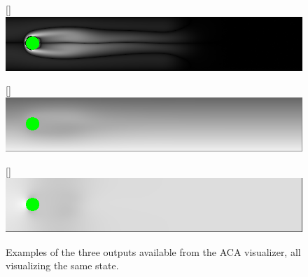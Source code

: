 \begin{figure}[ht]
    \centering
    [\linewidth]{\includegraphics[width=\linewidth,natwidth=660,natheight=120]{Ch20Research/figures/output_zeta.png}
    }
    
    [\linewidth]{\includegraphics[width=\linewidth,natwidth=660,natheight=120]{Ch20Research/figures/output_psi.png}
    }
    
    [\linewidth]{\includegraphics[width=\linewidth,natwidth=660,natheight=120]{Ch20Research/figures/output_pressure.png}
    }
    \caption{Examples of the three outputs available from the ACA visualizer, all visualizing the same state.}%
    \label{fig:ppms}
\end{figure}